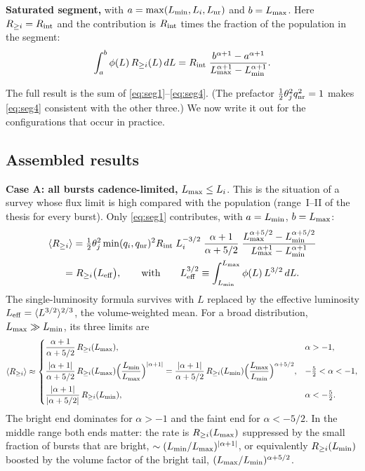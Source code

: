 \documentclass[11pt,a4paper]{article}
\newcommand{\nr}{{\rm nr}}
\newcommand{\Rint}{R_{\rm int}}
\newcommand{\Ravg}{\langle R_{\geq i}\rangle}
\newcommand{\Lmin}{L_{\rm min}}
\newcommand{\Lmax}{L_{\rm max}}
\newcommand{\Lnr}{L_{\rm nr}}
\begin{document}
\medskip\noindent\textbf{Saturated segment,} with $a=\max(\Lmin,L_i,\Lnr)$ and $b=\Lmax$. Here $R_{\geq i}=\Rint$ and the contribution is $\Rint$ times the fraction of the population in the segment:
\begin{equation}
\label{eq:seg4}
\int_a^b\phi(L)\,R_{\geq i}(L)\,dL=\Rint\;\frac{b^{\alpha+1}-a^{\alpha+1}}{\Lmax^{\alpha+1}-\Lmin^{\alpha+1}} .
\end{equation}

\medskip\noindent The full result is the sum of \eqref{eq:seg1}--\eqref{eq:seg4}. (The prefactor $\tfrac12\theta_j^2q_\nr^2=1$ makes \eqref{eq:seg4} consistent with the other three.) We now write it out for the configurations that occur in practice.

\subsection{Assembled results}
\label{sec:cases}

\noindent\textbf{Case A: all bursts cadence-limited,} $\Lmax\le L_i$. This is the situation of a survey whose flux limit is high compared with the population (range~I--II of the thesis for every burst). Only \eqref{eq:seg1} contributes, with $a=\Lmin$, $b=\Lmax$:
\begin{multline}
\label{eq:caseA}
\Ravg=\tfrac12\theta_j^2\min(q_i,q_\nr)^2\Rint\;L_i^{-3/2}\;\frac{\alpha+1}{\alpha+5/2}\;\frac{\Lmax^{\alpha+5/2}-\Lmin^{\alpha+5/2}}{\Lmax^{\alpha+1}-\Lmin^{\alpha+1}}\\
=R_{\geq i}\bigl(L_{\rm eff}\bigr),\qquad\text{with}\qquad L_{\rm eff}^{3/2}\equiv\int_{\Lmin}^{\Lmax}\phi(L)\,L^{3/2}\,dL .
\end{multline}
The single-luminosity formula survives with $L$ replaced by the effective luminosity $L_{\rm eff}=\langle L^{3/2}\rangle^{2/3}$, the volume-weighted mean. For a broad distribution, $\Lmax\gg\Lmin$, its three limits are
\begin{equation}
\label{eq:caseAlimits}
\Ravg\approx\begin{cases}
\dfrac{\alpha+1}{\alpha+5/2}\,R_{\geq i}(\Lmax), & \alpha>-1,\\[10pt]
\dfrac{|\alpha+1|}{\alpha+5/2}\,R_{\geq i}(\Lmax)\Bigl(\dfrac{\Lmin}{\Lmax}\Bigr)^{|\alpha+1|}=\dfrac{|\alpha+1|}{\alpha+5/2}\,R_{\geq i}(\Lmin)\Bigl(\dfrac{\Lmax}{\Lmin}\Bigr)^{\alpha+5/2}, & -\tfrac52<\alpha<-1,\\[10pt]
\dfrac{|\alpha+1|}{|\alpha+5/2|}\,R_{\geq i}(\Lmin), & \alpha<-\tfrac52 .
\end{cases}
\end{equation}
The bright end dominates for $\alpha>-1$ and the faint end for $\alpha<-5/2$. In the middle range both ends matter: the rate is $R_{\geq i}(\Lmax)$ suppressed by the small fraction of bursts that are bright, $\sim(\Lmin/\Lmax)^{|\alpha+1|}$, or equivalently $R_{\geq i}(\Lmin)$ boosted by the volume factor of the bright tail, $(\Lmax/\Lmin)^{\alpha+5/2}$.
\end{document}
